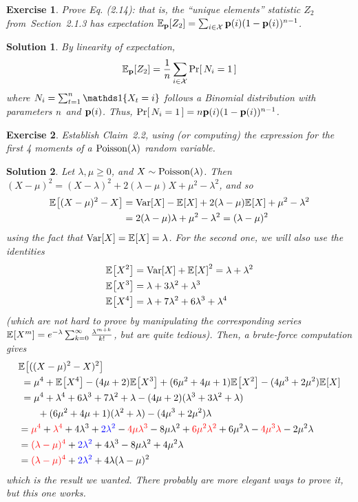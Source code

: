 \documentclass[biber]{nowfnt} %
\newtheorem{question}{Exercise}[chapter]
\newtheorem{solution}{Solution}[chapter]
\begin{document}
\begin{question}\label{ex:expectation:z2} 
  Prove Eq. (2.14): that is, the ``unique elements'' statistic $Z_2$ from~Section~2.1.3 has expectation $\bE{\p}{Z_2} = \sum_{i\in\domain} \p(i)(1-\p(i))^{\ns-1}$.
\end{question}
\begin{solution}
By linearity of expectation,
\[
\bE{\p}{Z_2} = \frac{1}{\ns}\sum_{i\in\domain} \probaOf{N_i = 1}
\]
where $N_i = \sum_{t=1}^\ns \indic{X_t=i}$ follows a Binomial distribution with parameters $n$ and $\mathbf{p}(i)$. Thus, $\probaOf{N_i = 1} = \ns \p(i)(1-\p(i))^{\ns-1}$.
\end{solution}
\begin{question}\label{ex:uniformity:moments:poisson}
  Establish Claim~2.2, using (or computing) the expression for the first 4 moments of a $\poisson{\lambda}$ random variable.
\end{question}
\begin{solution}
Let $\lambda,\mu\geq 0$, and $X\sim\poisson{\lambda}$. Then $(X-\mu)^2 = (X-\lambda)^2 + 2(\lambda-\mu)X + \mu^2-\lambda^2$, and so
\begin{align*}
	\bEE{(X-\mu)^2 - X} &= \Var[X] - \bEE{X} + 2(\lambda-\mu)\bEE{X} + \mu^2-\lambda^2 \\
	&= 2(\lambda-\mu)\lambda + \mu^2-\lambda^2
	= (\lambda-\mu)^2
\end{align*}
using the fact that $\Var[X] = \bEE{X} = \lambda$. For the second one, we will also use the identities
\begin{align*}
\bEE{X^2} &= \Var[X] + \bEE{X}^2 = \lambda+\lambda^2\\
\bEE{X^3} &= \lambda+3\lambda^2+\lambda^3\\
\bEE{X^4} &= \lambda+7\lambda^2+6\lambda^3+\lambda^4
\end{align*}
(which are not hard to prove by manipulating the corresponding series $\bEE{X^m} = e^{-\lambda} \sum_{k=0}^{\infty} \frac{\lambda^{m+k}}{k!}$, but are quite tedious).
Then, a brute-force computation gives
\begin{align*}
	&\bEE{((X-\mu)^2 - X)^2} \\
	&\;= 
	\mu^4+\bEE{X^4} - (4\mu+2)\bEE{X^3} + (6\mu^2+4\mu+1)\bEE{X^2} - (4\mu^3+2\mu^2)\bEE{X} \\
	&\;= 
	\mu^4+\lambda^4+6\lambda^3+7\lambda^2+\lambda
	- (4\mu+2)(\lambda^3 + 3\lambda^2 + \lambda) \\
	&\qquad+ (6\mu^2+4\mu+1)(\lambda^2+\lambda) - (4\mu^3+2\mu^2)\lambda \\
	&= \textcolor{red}{\mu^4}+\textcolor{red}{\lambda^4}+4\lambda^3+\textcolor{blue}{2\lambda^2} - \textcolor{red}{4\mu\lambda^3} - 8\mu\lambda^2 + \textcolor{red}{6\mu^2\lambda^2}+6\mu^2\lambda - \textcolor{red}{4\mu^3\lambda}-2\mu^2\lambda \\
	&= \textcolor{red}{(\lambda-\mu)^4} + \textcolor{blue}{2\lambda^2}
	+4\lambda^3- 8\mu\lambda^2+4\mu^2\lambda  \\
	&= \textcolor{red}{(\lambda-\mu)^4} + \textcolor{blue}{2\lambda^2}
	+4\lambda(\lambda-\mu)^2
\end{align*}
which is the result we wanted. There probably are more elegant ways to prove it, but this one works.
\end{solution}
\end{document}
